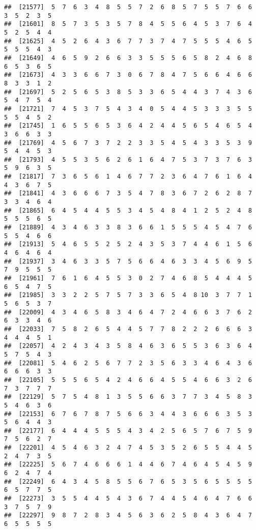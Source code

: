 \documentclass[
]{book}
\begin{document}
\begin{verbatim}
##  [21577]  5  7  6  3  4  8  5  5  7  2  6  8  5  7  5  5  7  6  6  3  5  2  3  5
##  [21601]  8  5  7  3  5  3  5  7  8  4  5  5  6  4  5  3  7  6  4  5  2  5  4  4
##  [21625]  4  5  2  6  4  3  6  7  7  3  7  4  7  5  5  5  4  6  5  5  5  5  4  3
##  [21649]  4  6  5  9  2  6  6  3  3  5  5  5  6  5  8  2  4  6  8  6  5  3  6  5
##  [21673]  4  3  3  6  6  7  3  0  6  7  8  4  7  5  6  6  4  6  6  8  3  3  1  2
##  [21697]  5  2  5  6  5  3  8  5  3  3  6  5  4  4  3  7  4  3  6  5  4  7  5  4
##  [21721]  7  4  5  3  7  5  4  3  4  0  5  4  4  5  3  3  3  5  5  5  5  4  5  2
##  [21745]  1  6  5  5  6  5  3  6  4  2  4  4  5  6  5  4  6  5  4  3  6  6  3  3
##  [21769]  4  5  6  7  3  7  2  2  3  3  5  4  5  4  3  3  5  3  9  5  4  4  5  3
##  [21793]  4  5  5  3  5  6  2  6  1  6  4  7  5  3  7  3  7  6  3  5  9  6  3  5
##  [21817]  7  3  6  5  6  1  4  6  7  7  2  3  6  4  7  6  1  6  4  4  3  6  7  5
##  [21841]  4  3  6  6  6  7  3  5  4  7  8  3  6  7  2  6  2  8  7  3  3  4  6  4
##  [21865]  6  4  5  4  4  5  5  3  4  5  4  8  4  1  2  5  2  4  8  5  5  5  6  5
##  [21889]  4  3  4  6  3  3  8  3  6  6  1  5  5  5  4  5  4  7  6  5  5  4  6  6
##  [21913]  5  4  6  5  5  2  5  2  4  3  5  3  7  4  4  6  1  5  6  4  6  4  6  4
##  [21937]  3  4  6  3  3  5  7  5  6  6  4  6  3  3  4  5  6  9  5  7  9  5  5  5
##  [21961]  7  6  1  6  4  5  5  3  0  2  7  4  6  8  5  4  4  4  5  6  5  4  7  5
##  [21985]  3  3  2  2  5  7  5  7  3  3  6  5  4  8 10  3  7  7  1  5  6  5  3  7
##  [22009]  4  3  4  6  5  8  3  4  6  4  7  2  4  6  6  3  7  6  2  6  3  3  4  6
##  [22033]  7  5  8  2  6  5  4  4  5  7  7  8  2  2  2  6  6  6  3  4  4  4  5  1
##  [22057]  4  2  4  3  4  3  5  8  4  6  3  6  5  5  3  6  3  6  4  5  7  5  4  3
##  [22081]  5  4  6  2  5  6  7  7  2  3  5  6  3  3  4  6  4  3  6  6  6  6  3  3
##  [22105]  5  5  5  6  5  4  2  4  6  6  4  5  5  4  6  6  3  2  6  7  3  7  7  7
##  [22129]  5  7  5  4  8  1  3  5  5  6  6  3  7  7  3  4  5  8  3  5  4  6  3  6
##  [22153]  6  7  6  7  8  7  5  6  6  3  4  4  3  6  6  6  3  5  3  5  6  4  4  3
##  [22177]  6  4  4  4  5  5  5  4  3  4  2  5  6  5  7  6  7  5  9  7  5  6  2  7
##  [22201]  4  5  4  6  3  2  4  7  4  5  3  5  2  6  5  5  4  4  5  2  4  7  3  5
##  [22225]  5  6  7  4  6  6  6  1  4  4  6  7  4  6  4  5  4  5  9  6  2  4  7  4
##  [22249]  6  4  3  4  5  8  5  5  6  7  6  5  3  5  6  5  5  5  5  6  5  7  7  5
##  [22273]  3  5  5  4  4  5  4  3  6  7  4  4  5  4  6  4  7  6  6  3  7  5  7  9
##  [22297]  9  8  7  2  8  3  4  5  6  3  6  2  5  8  4  3  6  4  7  6  5  5  5  5

\end{verbatim}
\end{document}
